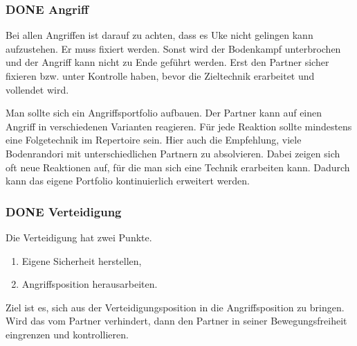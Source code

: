 \documentclass[11pt]{article}
\begin{document}
\subsubsection{{\bfseries\sffamily DONE} Angriff}
\label{sec:org9248aea}
Bei allen Angriffen ist darauf zu achten, dass es Uke nicht gelingen kann aufzustehen. 
Er muss fixiert werden. Sonst wird der Bodenkampf unterbrochen und der Angriff kann nicht zu Ende geführt werden.
Erst den Partner sicher fixieren bzw. unter Kontrolle haben, bevor die Zieltechnik erarbeitet und vollendet wird.

Man sollte sich ein Angriffsportfolio aufbauen. Der Partner kann auf einen Angriff in verschiedenen Varianten reagieren. Für jede Reaktion sollte mindestens eine Folgetechnik im Repertoire sein. Hier auch die Empfehlung, viele Bodenrandori mit unterschiedlichen Partnern zu absolvieren. Dabei zeigen sich oft neue Reaktionen auf, für die man sich eine Technik erarbeiten kann. Dadurch kann das eigene Portfolio kontinuierlich erweitert werden. 

\subsubsection{{\bfseries\sffamily DONE} Verteidigung}
\label{sec:org3796010}
Die Verteidigung hat zwei Punkte. 
\begin{enumerate}
\item Eigene Sicherheit herstellen,
\item Angriffsposition herausarbeiten.
\end{enumerate}
Ziel ist es, sich aus der Verteidigungsposition in die Angriffsposition zu bringen. 
Wird das vom Partner verhindert, dann den Partner in seiner Bewegungsfreiheit eingrenzen und kontrollieren.
\end{document}
